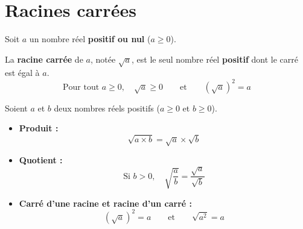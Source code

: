 \section{Racines carrées}

\begin{df}
	Soit $a$ un nombre réel \textbf{positif ou nul} ($a \geqslant 0$).

	La \textbf{racine carrée} de $a$, notée $\sqrt{a}$, est le seul nombre réel \textbf{positif} dont le carré est égal à $a$.
	\[
		\text{Pour tout } a \geqslant 0, \quad \sqrt{a} \geqslant 0 \qquad \text{et} \qquad \left( \sqrt{a} \right)^2 = a
	\]
\end{df}

\newpage

\begin{prop}
	Soient $a$ et $b$ deux nombres réels positifs ($a \geqslant 0$ et $b \geqslant 0$).

	\begin{itemize}
		\item \textbf{Produit :}
		      \[
			      \sqrt{a \times b} = \sqrt{a} \times \sqrt{b}
		      \]

		\item \textbf{Quotient :}
		      \[
			      \text{Si } b > 0, \quad \sqrt{\frac{a}{b}} = \frac{\sqrt{a}}{\sqrt{b}}
		      \]

		\item \textbf{Carré d'une racine et racine d'un carré :}
		      \[
			      \left( \sqrt{a} \right)^2 = a \qquad \text{et} \qquad \sqrt{a^2} = a
		      \]
	\end{itemize}
\end{prop}

